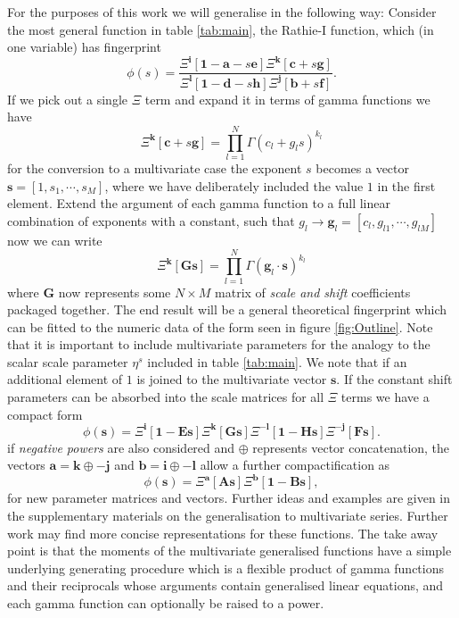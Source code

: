 \documentclass{article}
\begin{document}
For the purposes of this work we will generalise in the following way: Consider the most general function in table \ref{tab:main}, the Rathie-I function, which (in one variable) has fingerprint
\begin{equation}
\phi(s) =  \frac{\Xi^{\mathbf{i}}[\mathbf{1-a}-s\mathbf{e}]\Xi^{\mathbf{k}}[\mathbf{c}+s\mathbf{g}]}{\Xi^{\mathbf{l}}[\mathbf{1-d}-s\mathbf{h}] \Xi^{\mathbf{j}}[\mathbf{b} + s \mathbf{f}]}.
\end{equation}
If we pick out a single $\Xi$ term and expand it in terms of gamma functions we have
\begin{equation}
\Xi^{\mathbf{k}}[\mathbf{c} + s \mathbf{g}] = \prod_{l=1}^N \Gamma(c_l + g_l s )^{k_l}
\end{equation}
for the conversion to a multivariate case the exponent $s$ becomes a vector $\mathbf{s}=[1,s_1,\cdots,s_M]$, where we have deliberately included the value $1$ in the first element. Extend the argument of each gamma function to a full linear combination of exponents with a constant, such that $g_l \to \mathbf{g}_l =[c_l,g_{l1},\cdots,g_{lM}]$ now we can write
\begin{equation}
\Xi^{\mathbf{k}}[\mathbf{G}\mathbf{s}] = \prod_{l=1}^N \Gamma(\mathbf{g}_l \cdot \mathbf{s}  )^{k_l}
\end{equation}
where $\mathbf{G}$ now represents some $N \times M$ matrix of \emph{scale and shift} coefficients packaged together. The end result will be a general theoretical fingerprint which can be fitted to the numeric data of the form seen in figure \ref{fig:Outline}. Note that it is important to include multivariate parameters for the analogy to the scalar scale parameter $\eta^s$ included in table \ref{tab:main}. We note that if an additional element of $1$ is joined to the multivariate vector $\mathbf{s}$. If the constant shift parameters can be absorbed into the scale matrices for all $\Xi$ terms we have a compact form
\begin{equation}
\phi(\mathbf{s}) =  \Xi^{\mathbf{i}}[\mathbf{1}- \mathbf{Es}]\Xi^{\mathbf{k}}[\mathbf{Gs}]\Xi^{-\mathbf{l}}[\mathbf{1}-\mathbf{Hs}] \Xi^{-\mathbf{j}}[\mathbf{Fs}].
\end{equation}
if \emph{negative powers} are also considered and $\oplus$ represents vector concatenation, the vectors $\mathbf{a} =\mathbf{k \oplus -j}$ and $\mathbf{b} = \mathbf{i \oplus -l}$ allow a further compactification as   
\begin{equation}
\phi(\mathbf{s}) =  \Xi^{\mathbf{a}}[\mathbf{As}]\Xi^{\mathbf{b}}[\mathbf{1}- \mathbf{Bs}],
\label{eqn:final}
\end{equation}
for new parameter matrices and vectors. Further ideas and examples are given in the supplementary materials on the generalisation to multivariate series. Further work may find more concise representations for these functions. The take away point is that the moments of the multivariate generalised functions have a simple underlying generating procedure which is a flexible product of gamma functions and their reciprocals whose arguments contain generalised linear equations, and each gamma function can optionally be raised to a power.
\end{document}

